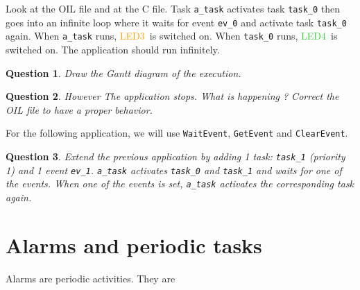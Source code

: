 \documentclass[11pt]{article}
\newtheorem{ex}{Question}
\newcommand{\LEDorange}{\textcolor{orange}{LED3}}
\newcommand{\LEDgreen}{\textcolor{LimeGreen}{LED4}}
\begin{document}
Look at the OIL file and at the C file. Task \lstinline{a_task} activates task \lstinline{task_0} then goes into an infinite loop where it waits for event \lstinline{ev_0} and activate task \lstinline{task_0} again. When \lstinline{a_task} runs, \LEDorange\ is switched on. When \lstinline{task_0} runs, \LEDgreen\ is switched on. The application should run infinitely. 

\begin{ex}
Draw the Gantt diagram of the execution.
\end{ex}

\begin{ex}
However The application stops. What is happening ? Correct the OIL file to have a proper behavior.
\end{ex}

For the following application, we will use \lstinline{WaitEvent}, \lstinline{GetEvent} and \lstinline{ClearEvent}.
\begin{ex}
Extend the previous application by adding 1 task: \texttt{task_1} (priority 1) and 1 event \texttt{ev_1}. \texttt{a_task} activates \texttt{task_0} and \texttt{task_1} and waits for one of the events. When one of the events is set, \texttt{a_task} activates the corresponding task again.
\end{ex}

\section{Alarms and periodic tasks}

Alarms are periodic activities. They are 
\end{document}
